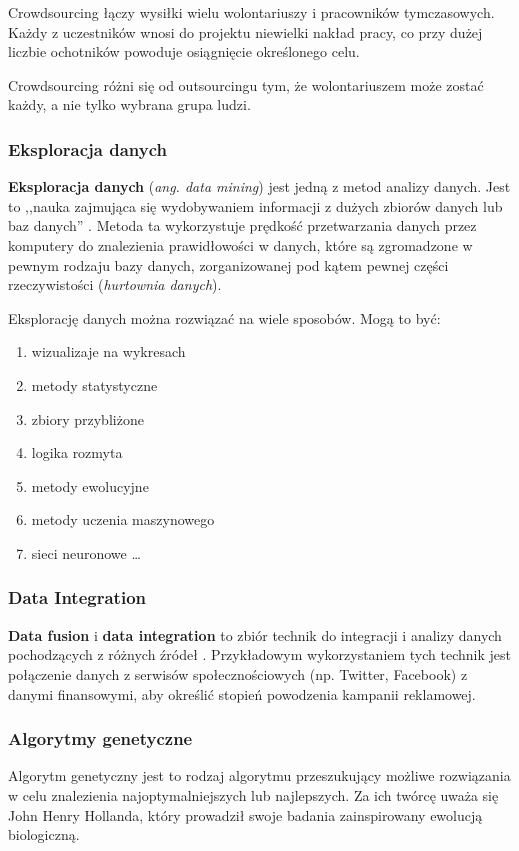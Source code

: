 Crowdsourcing łączy wysiłki wielu wolontariuszy i pracowników tymczasowych. Każdy z uczestników wnosi do projektu niewielki nakład pracy, co przy dużej liczbie ochotników powoduje osiągnięcie określonego celu.

Crowdsourcing różni się od outsourcingu tym, że wolontariuszem może zostać każdy, a nie tylko wybrana grupa ludzi.

\subsubsection{Eksploracja danych}
\label{sub:eksploracja_danych}
\textbf{Eksploracja danych} (\textit{ang. data mining}) jest jedną z metod analizy danych. Jest to ,,nauka zajmująca się wydobywaniem informacji z dużych zbiorów danych lub baz danych'' \cite{Hand01}. Metoda ta wykorzystuje prędkość przetwarzania danych przez komputery do znalezienia prawidłowości w danych, które są zgromadzone w pewnym rodzaju bazy danych, zorganizowanej pod kątem pewnej części rzeczywistości (\textit{hurtownia danych}). 

Eksplorację danych można rozwiązać na wiele sposobów. Mogą to być:
\begin{enumerate}
  \item wizualizaje na wykresach
  \item metody statystyczne
  \item zbiory przybliżone
  \item logika rozmyta
  \item metody ewolucyjne
  \item metody uczenia maszynowego
  \item sieci neuronowe \ldots
\end{enumerate}

\subsubsection{Data Integration}
\label{sub:data_integration}
\textbf{Data fusion} i \textbf{data integration} to zbiór technik do integracji i analizy danych pochodzących z różnych źródeł \cite{lenzerini02}. Przykładowym wykorzystaniem tych technik jest połączenie danych z serwisów społecznościowych (np. Twitter, Facebook) z danymi finansowymi, aby określić stopień powodzenia kampanii reklamowej.

\subsubsection{Algorytmy genetyczne}
\label{sub:algorytmy_genetyczne}
Algorytm genetyczny jest to rodzaj algorytmu przeszukujący możliwe rozwiązania w celu znalezienia najoptymalniejszych lub najlepszych. Za ich twórcę uważa się John Henry Hollanda, który prowadził swoje badania zainspirowany ewolucją biologiczną.

